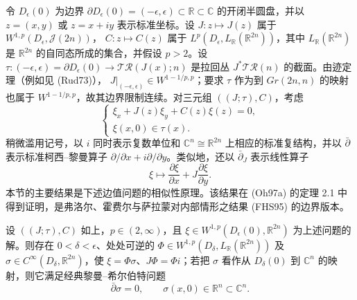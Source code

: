 令 $D_\epsilon(0)$ 为边界 $\partial D_\epsilon(0)=(-\epsilon,\epsilon)
\subset\mathbb R\subset\mathbb C$ 的开闭半圆盘，并以 $z=(x,y)$ 或 $z=x+iy$ 表示标准坐标。设
$J:z\mapsto J(z)$ 属于 $W^{1,p}(D_\epsilon,\mathcal J(2n))$，
$C:z\mapsto C(z)$ 属于 $L^p(D_\epsilon,L_\mathbb R(\mathbb R^{2n}))$，其中
$L_\mathbb R(\mathbb R^{2n})$ 是 $\mathbb R^{2n}$ 的自同态所成的集合，并假设
$p>2$。设
$\tau:(-\epsilon,\epsilon)=\partial D_\epsilon(0)\to
\mathcal{TR}(J(x);n)$ 是拉回丛 $J^*\mathcal{TR}(n)$ 的截面。由迹定理（例如见 (Rud73)），
$J|_{(-\epsilon,\epsilon)}\in W^{1-1/p,p}$；要求 $\tau$ 作为到
$Gr(2n,n)$ 的映射也属于 $W^{1-1/p,p}$，故其边界限制连续。对三元组
$((J;\tau),C)$，考虑
\begin{equation}
\begin{cases}\xi_x+J(z)\xi_y+C(z)\xi(z)=0,\\ \xi(x,0)\in\tau(x).
\end{cases}\label{eq:ch8-linear-rh-problem}
\end{equation}
稍微滥用记号，以 $i$ 同时表示复数单位和
$\mathbb C^n\cong\mathbb R^{2n}$ 上相应的标准复结构，并以
$\bar\partial$ 表示标准柯西--黎曼算子
$\partial/\partial x+i\partial/\partial y$。类似地，还以
$\bar\partial_J$ 表示线性算子
\[
 \xi\longmapsto\frac{\partial\xi}{\partial x}
 +J\frac{\partial\xi}{\partial y}.
\]
本节的主要结果是下述边值问题的相似性原理。该结果在 (Oh97a) 的定理 2.1
中得到证明，是弗洛尔、霍费尔与萨拉蒙对内部情形之结果 (FHS95) 的边界版本。
\begin{theorem}[相似性原理]\label{thm:ch8-similarity-principle}
设 $((J;\tau),C)$ 如上，$p\in(2,\infty)$，且
$\xi\in W^{1,p}(D_\epsilon(0),\mathbb R^{2n})$ 为上述问题的解。则存在
$0<\delta<\epsilon$、处处可逆的
$\Phi\in W^{1,p}(D_\delta,L_\mathbb R(\mathbb R^{2n}))$ 及
$\sigma\in C^\infty(D_\delta,\mathbb R^{2n})$，使
$\xi=\Phi\sigma$、$J\Phi=\Phi i$；若把 $\sigma$ 看作从 $D_\delta(0)$ 到 $\mathbb C^n$ 的映射，则它满足经典黎曼--希尔伯特问题
\begin{equation}\bar\partial\sigma=0,\qquad\sigma(x,0)\in\mathbb R^n\subset\mathbb C^n.\label{eq:ch8-classical-rh-problem}\end{equation}
\end{theorem}

